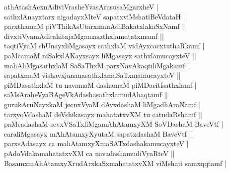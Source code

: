 \begin{entry}
\smallskip
\begin{shl}
athAtashAcxnAdiviVrasheYvasArasusaMgarxheV |\\[1pt]
sathxlAnayxtarx nigadayxMteV sapatxviMshatiBeVdataH ||\\[1pt]
parxthamaM piVThikAsUtarxmanAdiBakatxlakaSxNamf |\\[1pt]
divxtiVyamAdirahitajaMgamasathxlamutatxmamf ||\\[1pt]
taqtiVyaM shUnayxliMgasayx sathxlaM vidAyxcacxtuthaRkamf |\\[1pt]
paMcamaM niSakxlAKayxsayx liMgasayx sathxlamucayxteV ||\\[1pt]
mahAliMgasathxlaM SaSaThxM parxNavAkaqtiliMgakamf |\\[1pt]
sapatxmaM vishavxjananasathxlamaSaTxmamucayxteV ||\\[1pt]
piMDasathxlaM tu navamaM dashamaM piMDacitfsathxlamf |\\[1pt]
saMsAraheVyaBAgeVkAdashasathxlamudAhaqtamf ||\\[1pt]
gurukAruNayxkaM jecnxVyaM dAvxdashaM liMgadhAraNamf |\\[1pt]
tarxyoVdashaM deVshikasayx mahatatxvXM tu catudaRshamf ||\\[1pt]
paMcadashaM sevxVSaTxliMgamAhAtamxyXM SoVDashaM BaveVtf |\\[1pt]
caraliMgasayx mAhAtamxyXyutaM sapatxdashaM BaveVtf ||\\[1pt]
parxsAdasayx ca mahAtamxyXmaSATxdashakamucayxteV |\\[1pt]
pAdoVdakamahatatxvXM ca navadashamudiVyaRteV ||\\[1pt]
BasamxmAhAtamxyXrudArxkaSxmahatatxvXM viMshati samxqqtamf |

\end{shl}
\end{entry}
